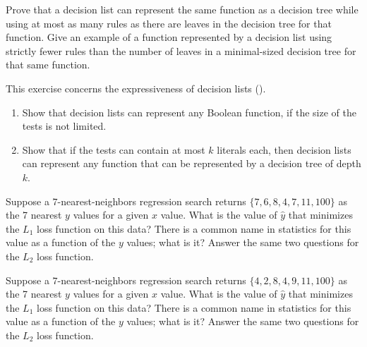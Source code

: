 \begin{exercise}
Prove that a decision list can represent the same function as a
decision tree while using at most as many rules as there are leaves in the
decision tree for that function.  Give an example of a function
represented by a decision list using strictly fewer rules than the
number of leaves in a minimal-sized decision tree for that same
function.
\end{exercise} 

\begin{exercise}%
This exercise concerns the expressiveness of decision
lists ().
\begin{enumerate}
\item Show that decision lists
can represent any Boolean function, if the size of the tests is not limited.
\item Show that if the tests can contain at most \(k\) literals each,
then decision lists can represent any function that can be represented
by a decision tree of depth \(k\).
\end{enumerate}
\end{exercise} 



\begin{uexercise}
Suppose a \(7\)-nearest-neighbors regression 
search returns  \( \{7, 6, 8, 4, 7, 11, 100\} \)
as the 7 nearest \(y\) values for a given \(x\) value.
What is the value of \(\hat{y}\) that minimizes the \(L_1\) loss
function on this data?  There is a common name in statistics for this
value as a function of the \(y\) values; what is it?  Answer the same
two questions for the \(L_2\) loss function.
\end{uexercise} 

\begin{iexercise}
Suppose a \(7\)-nearest-neighbors regression 
search returns  \( \{4, 2, 8, 4, 9, 11, 100\} \)
as the 7 nearest \(y\) values for a given \(x\) value.
What is the value of \(\hat{y}\) that minimizes the \(L_1\) loss
function on this data?  There is a common name in statistics for this
value as a function of the \(y\) values; what is it?  Answer the same
two questions for the \(L_2\) loss function.
\end{iexercise} 



